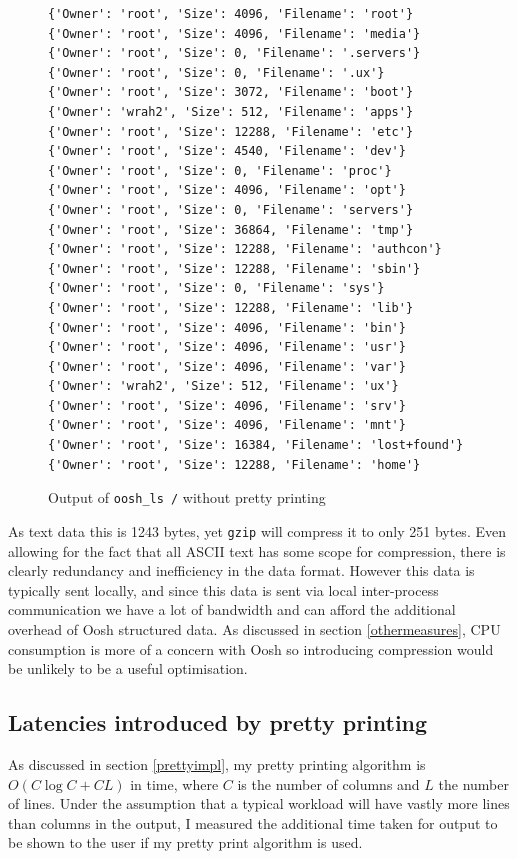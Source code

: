 \documentclass[12pt,twoside,notitlepage]{report}
\begin{document}
\begin{figure}
\begin{verbatim}
{'Owner': 'root', 'Size': 4096, 'Filename': 'root'}
{'Owner': 'root', 'Size': 4096, 'Filename': 'media'}
{'Owner': 'root', 'Size': 0, 'Filename': '.servers'}
{'Owner': 'root', 'Size': 0, 'Filename': '.ux'}
{'Owner': 'root', 'Size': 3072, 'Filename': 'boot'}
{'Owner': 'wrah2', 'Size': 512, 'Filename': 'apps'}
{'Owner': 'root', 'Size': 12288, 'Filename': 'etc'}
{'Owner': 'root', 'Size': 4540, 'Filename': 'dev'}
{'Owner': 'root', 'Size': 0, 'Filename': 'proc'}
{'Owner': 'root', 'Size': 4096, 'Filename': 'opt'}
{'Owner': 'root', 'Size': 0, 'Filename': 'servers'}
{'Owner': 'root', 'Size': 36864, 'Filename': 'tmp'}
{'Owner': 'root', 'Size': 12288, 'Filename': 'authcon'}
{'Owner': 'root', 'Size': 12288, 'Filename': 'sbin'}
{'Owner': 'root', 'Size': 0, 'Filename': 'sys'}
{'Owner': 'root', 'Size': 12288, 'Filename': 'lib'}
{'Owner': 'root', 'Size': 4096, 'Filename': 'bin'}
{'Owner': 'root', 'Size': 4096, 'Filename': 'usr'}
{'Owner': 'root', 'Size': 4096, 'Filename': 'var'}
{'Owner': 'wrah2', 'Size': 512, 'Filename': 'ux'}
{'Owner': 'root', 'Size': 4096, 'Filename': 'srv'}
{'Owner': 'root', 'Size': 4096, 'Filename': 'mnt'}
{'Owner': 'root', 'Size': 16384, 'Filename': 'lost+found'}
{'Owner': 'root', 'Size': 12288, 'Filename': 'home'}
\end{verbatim}
\caption{Output of {\tt oosh\_ls /} without pretty printing}
\label{lsroot}
\end{figure}

As text data this is 1243 bytes, yet {\tt gzip} will compress it to
only 251 bytes. Even allowing for the fact that all ASCII text has
some scope for compression, there is clearly redundancy and inefficiency in the
data format. However this data is typically sent locally, and since
this data is sent via local inter-process communication we have a lot
of bandwidth and can afford the additional overhead of Oosh structured
data. As discussed in section \ref{othermeasures}, CPU consumption is
more of a concern with Oosh so introducing compression would be
unlikely to be a useful optimisation.

\subsection{Latencies introduced by pretty printing}
\label{prettyspeed}
As discussed in section \ref{prettyimpl}, my pretty printing algorithm
is $O(C \log C + CL)$ in time, where $C$ is the number of columns and
$L$ the number of lines. Under the assumption that a typical workload
will have vastly more lines than columns in the output, I measured
the additional time taken for output to be shown to the user if my
pretty print algorithm is used.
\end{document}
